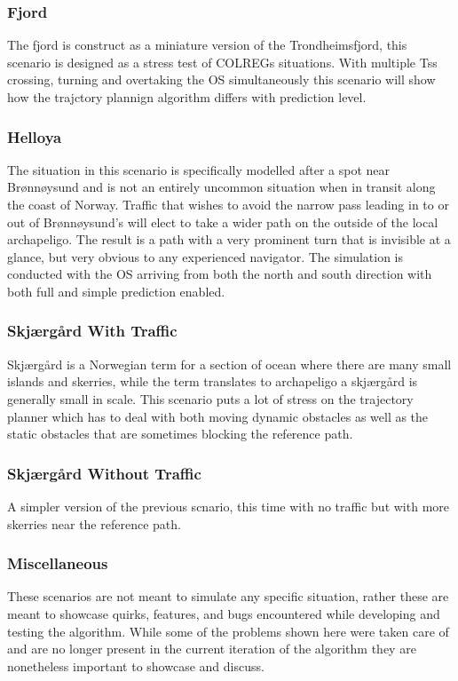 \subsubsection*{Fjord}
The fjord is construct as a miniature version of the Trondheimsfjord, this scenario is designed as a stress test of \gls{COLREGs} situations.
With multiple \gls{Ts}s crossing, turning and overtaking the \gls{OS} simultaneously this scenario will show how the trajctory plannign algorithm
differs with prediction level.

\subsubsection*{Helloya}
The situation in this scenario is specifically modelled after a spot near Brønnøysund and is not an entirely uncommon
situation when in transit along the coast of Norway. Traffic that wishes to avoid the narrow pass leading in to or out of
Brønnøysund's will elect to take a wider path on the outside of the local archapeligo. The result is a path with a very prominent
turn that is invisible at a glance, but very obvious to any experienced navigator. The simulation is conducted with the \gls{OS} arriving
from both the north and south direction with both full and simple prediction enabled. 

\subsubsection*{Skjærgård With Traffic}
Skjærgård is a Norwegian term for a section of ocean where there are many small islands and skerries, while the term translates to archapeligo a skjærgård is generally small in scale.
This scenario puts a lot of stress on the trajectory planner which has to deal with both moving dynamic obstacles as well as the static obstacles that are sometimes blocking the reference path.

\subsubsection*{Skjærgård Without Traffic}
A simpler version of the previous scnario, this time with no traffic but with more skerries near the reference path.

\subsubsection*{Miscellaneous}
These scenarios are not meant to simulate any specific situation, rather these are meant to showcase quirks, features, and bugs
encountered while developing and testing the algorithm. While some of the problems shown here were taken care of and are no longer present in the
current iteration of the algorithm they are nonetheless important to showcase and discuss.


